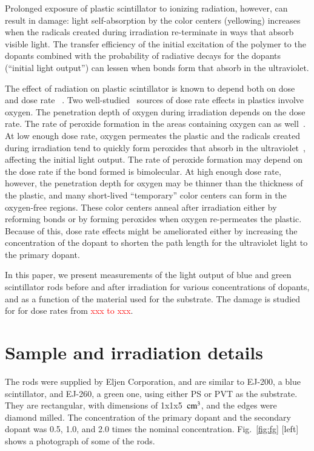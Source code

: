 \documentclass[review]{elsarticle}
\begin{document}
Prolonged exposure of plastic scintillator to
ionizing radiation, however, can result in damage:
light self-absorption by the color centers (yellowing) increases when the radicals created during irradiation re-terminate in ways that absorb visible light.
The transfer efficiency of the initial excitation of the polymer to the
dopants combined with the probability of radiative decays for the dopants (``initial light output'') can lessen
when bonds form that absorb in the ultraviolet.

The effect of radiation on plastic scintillator is known to depend
both on dose and dose rate ~\cite{sauli,34504,Wick1991472,289295,173180,173178,Giokaris1993315,gillen,1748-0221-11-10-T10004}.  
Two well-studied~\cite{clough1,bolland1,bolland2,bateman,cunliffe,Wick1991472,Biagtan1996125}
sources of dose rate effects in plastics
involve oxygen.   The penetration depth of oxygen
during irradiation depends on the dose rate.
The rate of peroxide
formation in the areas containing oxygen can as well~\cite{clough1}.
At low enough dose rate, oxygen permeates the plastic 
and the radicals created during irradiation tend to quickly
form peroxides that absorb in the ultraviolet~\cite{clough1}, affecting the initial light output.  
The rate of peroxide formation may depend on the dose rate if the bond formed is bimolecular.
At high enough dose rate, however, the penetration depth for oxygen may
be thinner than the thickness of the plastic, and many short-lived ``temporary'' color centers can form in the oxygen-free regions.  
These color centers anneal after irradiation either by reforming bonds or by forming peroxides when oxygen re-permeates the plastic.
Because of this, dose rate effects might be ameliorated either by increasing the concentration of the dopant to shorten the path length for the ultraviolet light to the primary dopant.


In this paper, we present measurements of the light output 
of blue and green scintillator rods 
before and after irradiation for various concentrations of dopants, and
as a function of the material used for the substrate.
The damage is studied for 
for dose rates from \textcolor{red}{xxx to xxx}.


\section{Sample and irradiation details}
The rods were supplied by Eljen Corporation, and
are similar to EJ-200, a blue scintillator, and EJ-260, a green one, using either
PS or PVT as the substrate.
They are rectangular, with dimensions of 1x1x5~$\rm{cm^3}$, 
and the edges were diamond milled.
The concentration of the primary dopant and the secondary dopant
was 0.5, 1.0, and 2.0 times the nominal concentration.
Fig.~\ref{fig:fg} [left] shows a photograph of some of the rods.
\end{document}

